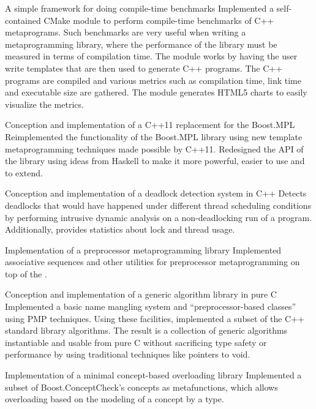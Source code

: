 \documentclass[10pt]{moderncv}
\newcommand{\myhref}[3][blue]{\href{#2}{\color{#1}{#3}}}
\begin{document}
{A simple framework for doing compile-time benchmarks}{
    Implemented a self-contained CMake module to perform compile-time benchmarks
    of C++ metaprograms. Such benchmarks are very useful when writing a
    metaprogramming library, where the performance of the library must be
    measured in terms of compilation time. The module works by having the user
    write \myhref{http://en.wikipedia.org/wiki/ERuby}{ERB} templates that are
    then used to generate C++ programs. The C++ programs are compiled and various
    metrics such as compilation time, link time and executable size are gathered.
    The module generates HTML5 charts to easily visualize the metrics.}

{Conception and implementation of a C++11 replacement for the Boost.MPL}{
    Reimplemented the functionality of the Boost.MPL library using new
    template metaprogramming techniques made possible by C++11. Redesigned
    the API of the library using ideas from Haskell to make it more powerful,
    easier to use and to extend.}

{Conception and implementation of a deadlock detection system in C++}{
    Detects deadlocks that would have happened under different thread scheduling
    conditions by performing intrusive dynamic analysis on a non-deadlocking run
    of a program. Additionally, provides statistics about lock and thread usage.}

{Implementation of a preprocessor metaprogramming library}{
    Implemented associative sequences and other utilities for preprocessor
    metaprogramming on top of the
    \myhref{http://sourceforge.net/projects/chaos-pp}{Chaos preprocessor library}.}

{Conception and implementation of a generic algorithm library in pure C}{
    Implemented a basic name mangling system and ``preprocessor-based classes''
    using PMP techniques. Using these facilities, implemented a subset of the
    C++ standard library algorithms. The result is a collection of generic
    algorithms instantiable and usable from pure C without sacrificing type
    safety or performance by using traditional techniques like pointers to void.}

{Implementation of a minimal concept-based overloading library}{
    Implemented a subset of Boost.ConceptCheck's concepts as metafunctions,
    which allows overloading based on the modeling of a concept by a type.}
\end{document}
